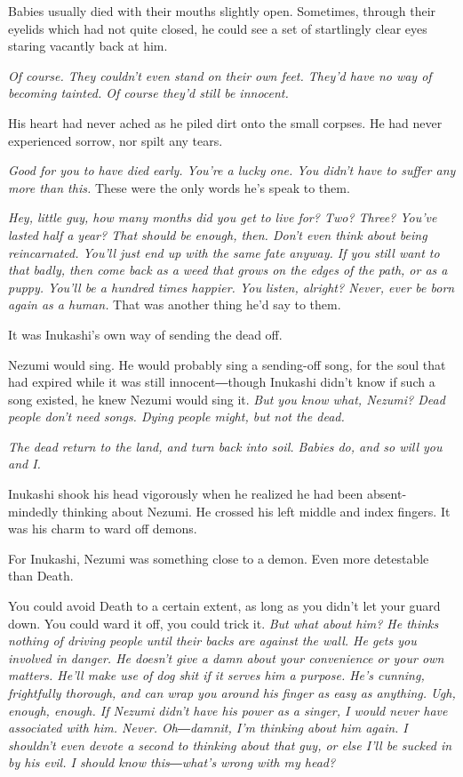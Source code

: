 Babies usually died with their mouths slightly open. Sometimes, through
their eyelids which had not quite closed, he could see a set of
startlingly clear eyes staring vacantly back at him.

\emph{Of course. They couldn't even stand on their own feet. They'd have no
	way of becoming tainted. Of course they'd still be innocent.}

His heart had never ached as he piled dirt onto the small corpses. He
had never experienced sorrow, nor spilt any tears.

\emph{Good for you to have died early. You're a lucky one. You didn't have to
	suffer any more than this.} These were the only words he's speak to them.

\emph{Hey, little guy, how many months did you get to live for? Two? Three?
	You've lasted half a year? That should be enough, then. Don't even think
	about being reincarnated. You'll just end up with the same fate anyway.
	If you still want to that badly, then come back as a weed that grows on
	the edges of the path, or as a puppy. You'll be a hundred times happier.
	You listen, alright? Never, ever be born again as a human.} That was
another thing he'd say to them.

It was Inukashi's own way of sending the dead off.

Nezumi would sing. He would probably sing a sending-off song, for the
soul that had expired while it was still innocent―though Inukashi didn't
know if such a song existed, he knew Nezumi would sing it. \emph{But you know
	what, Nezumi? Dead people don't need songs. Dying people might, but not
	the dead.}

\emph{The dead return to the land, and turn back into soil. Babies do, and so
	will you and I.}

Inukashi shook his head vigorously when he realized he had been
absent-mindedly thinking about Nezumi. He crossed his left middle and
index fingers. It was his charm to ward off demons.

For Inukashi, Nezumi was something close to a demon. Even more
detestable than Death.

You could avoid Death to a certain extent, as long as you didn't let
your guard down. You could ward it off, you could trick it. \emph{But what
	about him? He thinks nothing of driving people until their backs are
	against the wall. He gets you involved in danger. He doesn't give a damn
	about your convenience or your own matters. He'll make use of dog shit
	if it serves him a purpose. He's cunning, frightfully thorough, and can
	wrap you around his finger as easy as anything. Ugh, enough, enough. If
	Nezumi didn't have his power as a singer, I would never have associated
	with him. Never. Oh―damnit, I'm thinking about him again. I shouldn't
	even devote a second to thinking about that guy, or else I'll be sucked
	in by his evil. I should know this―what's wrong with my head?}

